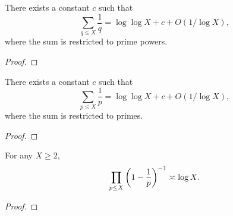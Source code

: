 \begin{lemma}\label{lem:mertens1}
  \leanok
There exists a constant $c$ such that
\[\sum_{q\leq X}\frac{1}{q} = \log\log X+c+O(1/\log X),\]
where the sum is restricted to prime powers.
\end{lemma}
\begin{proof}
  \leanok

\end{proof}

\begin{lemma}\label{lem:mertensprimes}
  \leanok
There exists a constant $c$ such that
\[\sum_{p\leq X}\frac{1}{p} = \log\log X+c+O(1/\log X),\]
where the sum is restricted to primes.
\end{lemma}
\begin{proof}
  \leanok

\end{proof}

\begin{lemma}\label{lem:mertens2}
  \leanok
For any $X\geq 2$,
\[\prod_{p\leq X}\left( 1-\frac{1}{p}\right)^{-1}\asymp \log X.\]
\end{lemma}
\begin{proof}
  \leanok

\end{proof}

